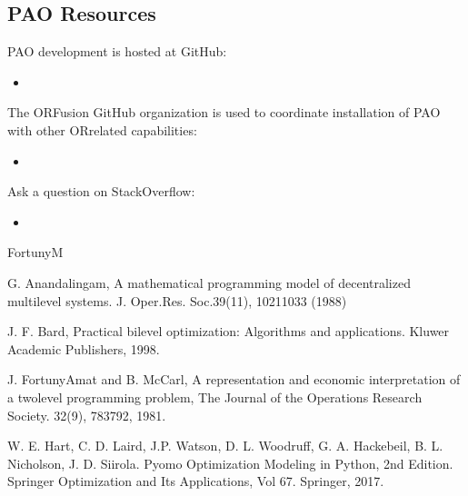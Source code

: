 \documentclass[letterpaper,10pt,english]{sphinxmanual}
\begin{document}
\subsection{PAO Resources}
\label{\detokenize{index:pao-resources}}
PAO development is hosted at GitHub:
\begin{itemize}
\item {} 

\end{itemize}

The OR\sphinxhyphen{}Fusion GitHub organization is used to coordinate installation of
PAO with other OR\sphinxhyphen{}related capabilities:
\begin{itemize}
\item {} 

\end{itemize}

Ask a question on StackOverflow:
\begin{itemize}
\item {} 

\end{itemize}
\fi


\begin{sphinxthebibliography}{FortunyM}

G. Anandalingam, A mathematical programming model of decentralized multi\sphinxhyphen{}level systems.
J. Oper.Res. Soc.39(11), 1021\textendash{}1033 (1988)

J. F. Bard, Practical bilevel optimization: Algorithms and
applications. Kluwer Academic Publishers, 1998.

J. Fortuny\sphinxhyphen{}Amat and B. McCarl, A representation and economic interpretation of a two\sphinxhyphen{}level programming problem,
The Journal of the Operations Research Society. 32(9), 783\sphinxhyphen{}792, 1981.


W. E. Hart, C. D. Laird,
J.\sphinxhyphen{}P. Watson, D. L. Woodruff, G. A. Hackebeil, B. L. Nicholson,
J. D. Siirola. Pyomo \sphinxhyphen{} Optimization Modeling in Python,
2nd Edition.  Springer Optimization and Its
Applications, Vol 67.  Springer, 2017.


\end{sphinxthebibliography}



\renewcommand{\indexname}{Index}
\printindex
\end{document}
